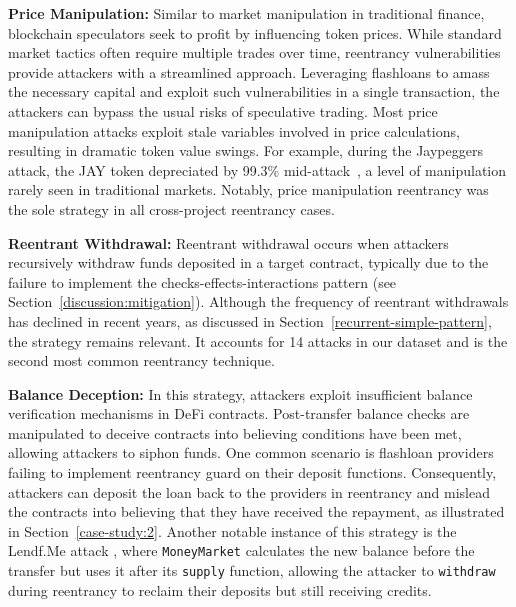 \textbf{Price Manipulation:}
\label{attack-strategy:price-manipulation}
Similar to market manipulation in traditional finance, blockchain speculators seek to profit by influencing token prices. While standard market tactics often require multiple trades over time, reentrancy vulnerabilities provide attackers with a streamlined approach. Leveraging flashloans to amass the necessary capital and exploit such vulnerabilities in a single transaction, the attackers can bypass the usual risks of speculative trading.
Most price manipulation attacks exploit stale variables involved in price calculations, resulting in dramatic token value swings. For example, during the Jaypeggers attack, the JAY token depreciated by 99.3\% mid-attack~\cite{attack-report:jaypeggers}, a level of manipulation rarely seen in traditional markets. Notably, price manipulation reentrancy was the sole strategy in all cross-project reentrancy cases.

\textbf{Reentrant Withdrawal:}
Reentrant withdrawal occurs when attackers recursively withdraw funds deposited in a target contract, typically due to the failure to implement the checks-effects-interactions pattern (see Section~\ref{discussion:mitigation}). %
Although the frequency of reentrant withdrawals has declined in recent years, as discussed in Section~\ref{recurrent-simple-pattern}, the strategy remains relevant. It accounts for 14 attacks in our dataset and is the second most common reentrancy technique.

\textbf{Balance Deception:}
In this strategy, attackers exploit insufficient balance verification mechanisms in DeFi contracts. Post-transfer balance checks are manipulated to deceive contracts into believing conditions have been met, allowing attackers to siphon funds. One common scenario is flashloan providers failing to implement reentrancy guard on their deposit functions. Consequently, attackers can deposit the loan back to the providers in reentrancy and mislead the contracts into believing that they have received the repayment, as illustrated in Section~\ref{case-study:2}. 
Another notable instance of this strategy is the Lendf.Me attack \cite{attack-report:lendf-me}, where \lstinline{MoneyMarket} calculates the new balance before the transfer but uses it after its \lstinline{supply} function, allowing the attacker to \lstinline{withdraw} during reentrancy to reclaim their deposits but still receiving credits.

